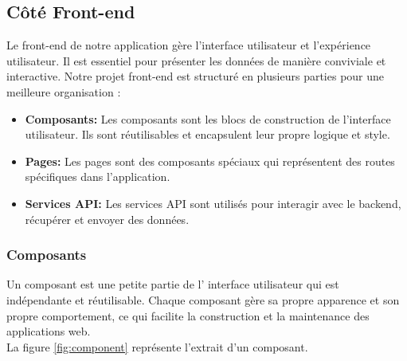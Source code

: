 \documentclass[12pt]{report}
\begin{document}
			\subsection{Côté Front-end}

			\hspace{15pt} Le front-end de notre application gère l'interface utilisateur et l'expérience utilisateur. Il est essentiel pour présenter les données de manière conviviale et interactive. Notre projet front-end est structuré en plusieurs parties pour une meilleure organisation :

			\begin{itemize}
				\item \textbf{Composants:} Les composants sont les blocs de construction de l'interface utilisateur. Ils sont réutilisables et encapsulent leur propre logique et style.
				\item  \textbf{Pages:} Les pages sont des composants spéciaux qui représentent des routes spécifiques dans l'application.
				\item \textbf{Services API:} Les services API sont utilisés pour interagir avec le backend, récupérer et envoyer des données.
			\end{itemize}

			\subsubsection{Composants}
			\hspace{15pt} Un composant est une petite partie de l' interface utilisateur qui est indépendante et réutilisable. Chaque composant gère sa propre apparence et son propre comportement, ce qui facilite la construction et la maintenance des applications web.\\

			La figure \ref{fig:component} représente l'extrait d'un composant.
			
\end{document}
